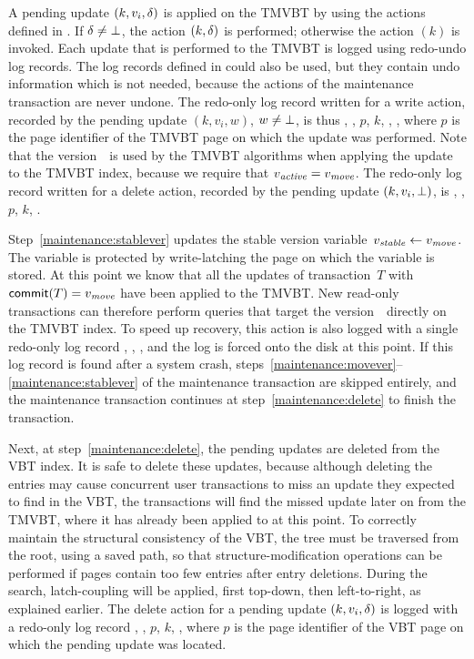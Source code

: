 A pending update $(k, v_i, \delta)$ is applied on the TMVBT by using the
actions defined in .
If $\delta \neq \bot$, the action $(k, 
\delta)$ is performed; otherwise the action $(k)$ is
invoked.
Each update that is performed to the TMVBT is logged using redo-undo
log records. 
The log records defined in  could also be used, but
they contain undo information which is not needed, because the actions of
the maintenance transaction are never undone.
The redo-only log record written for a write action, recorded by the pending
update $(k, v_i, w)$, $w \neq \bot$, is thus
, , $p$, $k$, \movever, , where $p$ is
the page identifier of the TMVBT page on which the update was performed. 
Note that the version~\movever\ is used by the TMVBT algorithms when applying
the update to the TMVBT index, because we require that $\smash{v_{\text{\textit{active}}}} = \smash{v_{\text{\textit{move}}}}$.
The redo-only log record written for a delete action, recorded by the pending
update $(k, v_i, \bot)$, is , , $p$,
$k$, \lre{\movever}.

Step~\ref{maintenance:stablever} updates the stable version
variable~$\smash{v_{\text{\textit{stable}}}} \gets \smash{v_{\text{\textit{move}}}}$. 
The variable is protected by write-latching the page on which the
variable is stored.
At this point we know that all the updates of transaction~$T$ with
$\text{\textsf{commit}}(T) = \smash{v_{\text{\textit{move}}}}$ have been applied to the TMVBT\@. 
New read-only transactions can therefore perform queries that target
the version~\movever\ directly on the TMVBT index.
To speed up recovery, this action is also logged with a single
redo-only log record , , \lre{\stablever},
and the log is forced onto the disk at this point.
If this log record is found after a system crash,
steps~\ref{maintenance:movever}--\ref{maintenance:stablever}  
of the maintenance transaction are skipped entirely, and the
maintenance transaction continues at step~\ref{maintenance:delete}
to finish the transaction.

Next, at step~\ref{maintenance:delete}, the pending updates are deleted from
the VBT index.
It is safe to delete these updates, because although deleting the entries may
cause concurrent user transactions to miss an update they expected to find in
the VBT, the transactions will find the missed update later on from the
TMVBT, where it has already been applied to at this point.
To correctly maintain the structural consistency of the VBT, the tree must be
traversed from the root, using a saved path, so that structure-modification
operations can be performed if pages contain too few entries after entry
deletions.
During the search, latch-coupling will be applied, first top-down, then
left-to-right, as explained earlier. 
The delete action for a pending update $(k, v_i, \delta)$ is logged with
a redo-only log record , , $p$, $k$, ,
where $p$ is the page identifier of the VBT page on which the pending update
was located.

